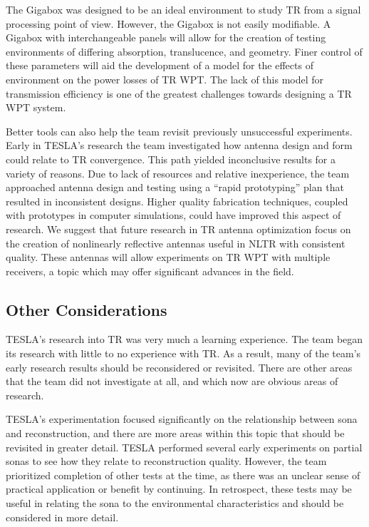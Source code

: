 The Gigabox was designed to be an ideal environment to study TR from a signal processing point of view. However, the Gigabox is not easily modifiable. A Gigabox with interchangeable panels will allow for the creation of testing environments of differing absorption, translucence, and geometry. Finer control of these parameters will aid the development of a model for the effects of environment on the power losses of TR WPT. The lack of this model for transmission efficiency is one of the greatest challenges towards designing a TR WPT system.

Better tools can also help the team revisit previously unsuccessful experiments. Early in TESLA's research the team investigated how antenna design and form could relate to TR convergence.  This path yielded inconclusive results for a variety of reasons. Due to lack of resources and relative inexperience, the team approached antenna design and testing using a ``rapid prototyping'' plan that resulted in inconsistent designs. Higher quality fabrication techniques, coupled with prototypes in computer simulations, could have improved this aspect of research.  We suggest that future research in TR antenna optimization focus on the creation of nonlinearly reflective antennas useful in NLTR with consistent quality.  These antennas will allow experiments on TR WPT with multiple receivers, a topic which may offer significant advances in the field.

\subsection{Other Considerations}

TESLA's research into TR was very much a learning experience.  The team began its research with little to no experience with TR.  As a result, many of the team's early research results should be reconsidered or revisited. There are other areas that the team did not investigate at all, and which now are obvious areas of research.

TESLA's experimentation focused significantly on the relationship between sona and reconstruction, and there are more areas within this topic that should be revisited in greater detail.  TESLA performed several early experiments on partial sonas to see how they relate to reconstruction quality.  However, the team prioritized completion of other tests at the time, as there was an unclear sense of practical application or benefit by continuing.  In retrospect, these tests may be useful in relating the sona to the environmental characteristics and should be considered in more detail.

